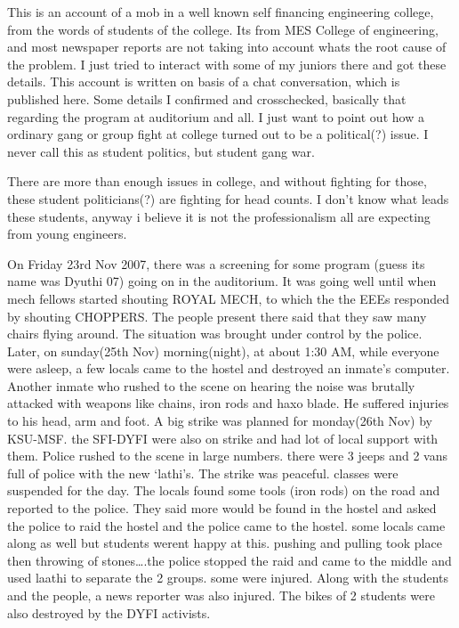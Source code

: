 \vskip 2pt

This is an account of a mob in a well known self financing engineering college, from the words of students of the college. Its from MES College of engineering, and most newspaper reports are not taking into account whats the root cause of the problem. I just tried to interact with some of my juniors there and got these details. This account is written on basis of a chat conversation, which is published here. Some details I confirmed and crosschecked, basically that regarding the program at auditorium and all. I just want to point out how a ordinary gang or group fight at college turned out to be a political(?) issue. I never call this as student politics, but student gang war.

There are more than enough issues in college, and without fighting for those, these student politicians(?) are fighting for head counts. I don’t know what leads these students, anyway i believe it is not the professionalism all are expecting from young engineers.

On Friday 23rd Nov 2007, there was a screening for some program (guess its name was Dyuthi 07) going on in the auditorium. It was going well until when mech fellows started shouting ROYAL MECH, to which the the EEEs responded by shouting CHOPPERS. The people present there said that they saw many chairs flying around. The situation was brought under control by the police.
Later, on sunday(25th Nov) morning(night), at about 1:30 AM, while everyone were asleep, a few locals came to the hostel and destroyed an inmate’s computer. Another inmate who rushed to the scene on hearing the noise was brutally attacked with weapons like chains, iron rods and haxo blade. He suffered injuries to his head, arm and foot.
A big strike was planned for monday(26th Nov) by KSU-MSF. the SFI-DYFI were also on strike and had lot of local support with them. Police rushed to the scene in large numbers. there were 3 jeeps and 2 vans full of police with the new ‘lathi’s. The strike was peaceful. classes were suspended for the day.
The locals found some tools (iron rods) on the road and reported to the police. They said more would be found in the hostel and asked the police to raid the hostel and the police came to the hostel. some locals came along as well but students werent happy at this. pushing and pulling took place then throwing of stones….the police stopped the raid and came to the middle and used laathi to separate the 2 groups. some were injured.
Along with the students and the people, a news reporter was also injured. The bikes of 2 students were also destroyed by the DYFI activists.

